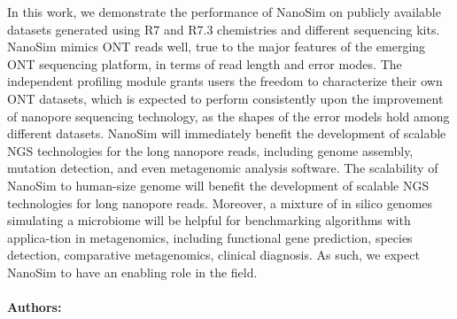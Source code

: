 In   this   work,   we   demonstrate   the   performance   of   NanoSim   on   publicly   available  
datasets   generated   using   R7   and   R7.3   chemistries   and   different   sequencing   kits.  
NanoSim   mimics   ONT   reads   well,   true   to   the   major   features   of   the   emerging   ONT  
sequencing  platform,  in  terms  of  read  length  and  error  modes.  The  independent  profiling  
module   grants   users   the   freedom   to   characterize   their   own   ONT   datasets,   which   is  
expected   to   perform   consistently   upon   the   improvement   of   nanopore   sequencing  
technology,  as  the  shapes  of  the  error  models  hold  among  different  datasets.  NanoSim  will   immediately   benefit   the   development   of   scalable   NGS   technologies   for   the   long  
nanopore   reads,   including   genome   assembly,   mutation   detection,   and   even  
metagenomic  analysis  software.  The  scalability  of  NanoSim  to  human-­size  genome  will  
benefit   the   development   of   scalable   NGS   technologies   for   long   nanopore   reads.  
Moreover,   a   mixture   of   in   silico   genomes   simulating   a   microbiome   will   be   helpful   for  
benchmarking   algorithms   with   applica-­tion   in   metagenomics,   including   functional   gene  
prediction,   species   detection,   comparative   metagenomics,   clinical   diagnosis.   As   such,  
we  expect  NanoSim  to  have  an  enabling  role  in  the  field. 

\noindent \paragraph{Authors:} 

